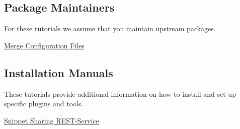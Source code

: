 \subsection*{Package Maintainers}

For these tutorials we assume that you maintain upstream packages.


\begin{DoxyItemize}
\item \hyperlink{doc_tutorials_elektra-merge-integration_md}{Merge Configuration Files}
\end{DoxyItemize}

\subsection*{Installation Manuals}

These tutorials provide additional information on how to install and set up specific plugins and tools.


\begin{DoxyItemize}
\item \hyperlink{doc_tutorials_snippet-sharing-rest-service_md}{Snippet Sharing R\+E\+S\+T-\/\+Service} 
\end{DoxyItemize}